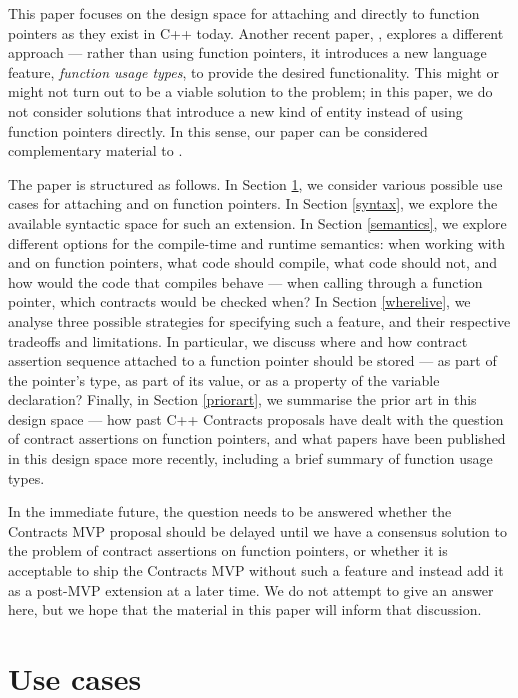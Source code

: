 This paper focuses on the design space for attaching  and  directly to function pointers as they exist in C++ today. Another recent paper, \cite{P3271R0}, explores a different approach --- rather than using function pointers, it introduces a new language feature, \emph{function usage types}, to provide the desired functionality. This might or might not turn out to be a viable solution to the problem; in this paper, we do not consider solutions that introduce a new kind of entity instead of using function pointers directly. In this sense, our paper can be considered complementary material to \cite{P3271R0}.

The paper is structured as follows. In Section \ref{usecases}, we consider various possible use cases for attaching  and  on function pointers. In Section \ref{syntax}, we explore the available syntactic space for such an extension. In Section \ref{semantics}, we explore different options for the compile-time and runtime semantics: when working with  and  on function pointers, what code should compile, what code should not, and how would the code that compiles behave --- when calling through a function pointer, which contracts would be checked when? In Section \ref{wherelive}, we analyse three possible strategies for specifying such a feature, and their respective tradeoffs and limitations. In particular, we discuss where and how contract assertion sequence attached to a function pointer should be stored --- as part of the pointer's type, as part of its value, or as a property of the variable declaration? Finally, in Section \ref{priorart}, we summarise the prior art in this design space --- how past C++ Contracts proposals have dealt with the question of contract assertions on function pointers, and what papers have been published in this design space more recently, including a brief summary of function usage types.

In the immediate future, the question needs to be answered whether the Contracts MVP proposal \cite{P2900R8} should be delayed until we have a consensus solution to the problem of contract assertions on function pointers, or whether it is acceptable to ship the Contracts MVP without such a feature and instead add it as a post-MVP extension at a later time. We do not attempt to give an answer here, but we hope that the material in this paper will inform that discussion.

\section{Use cases}
\label{usecases}

